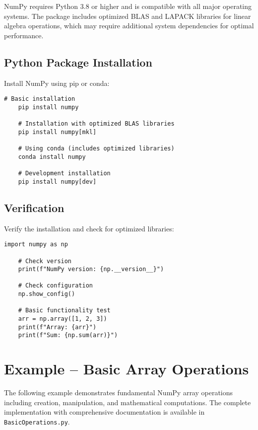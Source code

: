 NumPy requires Python 3.8 or higher and is compatible with all major operating systems. The package includes optimized BLAS and LAPACK libraries for linear algebra operations, which may require additional system dependencies for optimal performance.

\subsection{Python Package Installation}
\label{subsec:python_install}

Install NumPy using pip or conda:

\begin{lstlisting}[style=bashstyle, caption={NumPy Installation}]
	# Basic installation
	pip install numpy
	
	# Installation with optimized BLAS libraries
	pip install numpy[mkl]
	
	# Using conda (includes optimized libraries)
	conda install numpy
	
	# Development installation
	pip install numpy[dev]
\end{lstlisting}

\subsection{Verification}
\label{subsec:verification}

Verify the installation and check for optimized libraries:

\begin{lstlisting}[language=MyPython, caption={NumPy Installation Verification}]
	import numpy as np
	
	# Check version
	print(f"NumPy version: {np.__version__}")
	
	# Check configuration
	np.show_config()
	
	# Basic functionality test
	arr = np.array([1, 2, 3])
	print(f"Array: {arr}")
	print(f"Sum: {np.sum(arr)}")
\end{lstlisting}

\section{Example -- Basic Array Operations}
\label{sec:basic_example}

The following example demonstrates fundamental NumPy array operations including creation, manipulation, and mathematical computations. The complete implementation with comprehensive documentation is available in \texttt{BasicOperations.py}.

